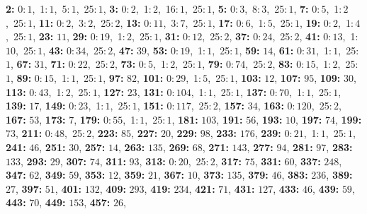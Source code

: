 \textsf{\bfseries 2:} 0:\,$1$,\ 1:\,$1$,\ 5:\,$1$,\ 25:\,$1$, \textsf{\bfseries 3:} 0:\,$2$,\ 1:\,$2$,\ 16:\,$1$,\ 25:\,$1$, \textsf{\bfseries 5:} 0:\,$3$,\ 8:\,$3$,\ 25:\,$1$, \textsf{\bfseries 7:} 0:\,$5$,\ 1:\,$2$,\ 25:\,$1$, \textsf{\bfseries 11:} 0:\,$2$,\ 3:\,$2$,\ 25:\,$2$, \textsf{\bfseries 13:} 0:\,$11$,\ 3:\,$7$,\ 25:\,$1$, \textsf{\bfseries 17:} 0:\,$6$,\ 1:\,$5$,\ 25:\,$1$, \textsf{\bfseries 19:} 0:\,$2$,\ 1:\,$4$,\ 25:\,$1$, \textsf{\bfseries 23:} $11$, \textsf{\bfseries 29:} 0:\,$19$,\ 1:\,$2$,\ 25:\,$1$, \textsf{\bfseries 31:} 0:\,$12$,\ 25:\,$2$, \textsf{\bfseries 37:} 0:\,$24$,\ 25:\,$2$, \textsf{\bfseries 41:} 0:\,$13$,\ 1:\,$10$,\ 25:\,$1$, \textsf{\bfseries 43:} 0:\,$34$,\ 25:\,$2$, \textsf{\bfseries 47:} $39$, \textsf{\bfseries 53:} 0:\,$19$,\ 1:\,$1$,\ 25:\,$1$, \textsf{\bfseries 59:} $14$, \textsf{\bfseries 61:} 0:\,$31$,\ 1:\,$1$,\ 25:\,$1$, \textsf{\bfseries 67:} $31$, \textsf{\bfseries 71:} 0:\,$22$,\ 25:\,$2$, \textsf{\bfseries 73:} 0:\,$5$,\ 1:\,$2$,\ 25:\,$1$, \textsf{\bfseries 79:} 0:\,$74$,\ 25:\,$2$, \textsf{\bfseries 83:} 0:\,$15$,\ 1:\,$2$,\ 25:\,$1$, \textsf{\bfseries 89:} 0:\,$15$,\ 1:\,$1$,\ 25:\,$1$, \textsf{\bfseries 97:} $82$, \textsf{\bfseries 101:} 0:\,$29$,\ 1:\,$5$,\ 25:\,$1$, \textsf{\bfseries 103:} $12$, \textsf{\bfseries 107:} $95$, \textsf{\bfseries 109:} $30$, \textsf{\bfseries 113:} 0:\,$43$,\ 1:\,$2$,\ 25:\,$1$, \textsf{\bfseries 127:} $23$, \textsf{\bfseries 131:} 0:\,$104$,\ 1:\,$1$,\ 25:\,$1$, \textsf{\bfseries 137:} 0:\,$70$,\ 1:\,$1$,\ 25:\,$1$, \textsf{\bfseries 139:} $17$, \textsf{\bfseries 149:} 0:\,$23$,\ 1:\,$1$,\ 25:\,$1$, \textsf{\bfseries 151:} 0:\,$117$,\ 25:\,$2$, \textsf{\bfseries 157:} $34$, \textsf{\bfseries 163:} 0:\,$120$,\ 25:\,$2$, \textsf{\bfseries 167:} $53$, \textsf{\bfseries 173:} $7$, \textsf{\bfseries 179:} 0:\,$55$,\ 1:\,$1$,\ 25:\,$1$, \textsf{\bfseries 181:} $103$, \textsf{\bfseries 191:} $56$, \textsf{\bfseries 193:} $10$, \textsf{\bfseries 197:} $74$, \textsf{\bfseries 199:} $73$, \textsf{\bfseries 211:} 0:\,$48$,\ 25:\,$2$, \textsf{\bfseries 223:} $85$, \textsf{\bfseries 227:} $20$, \textsf{\bfseries 229:} $98$, \textsf{\bfseries 233:} $176$, \textsf{\bfseries 239:} 0:\,$21$,\ 1:\,$1$,\ 25:\,$1$, \textsf{\bfseries 241:} $46$, \textsf{\bfseries 251:} $30$, \textsf{\bfseries 257:} $14$, \textsf{\bfseries 263:} $135$, \textsf{\bfseries 269:} $68$, \textsf{\bfseries 271:} $143$, \textsf{\bfseries 277:} $94$, \textsf{\bfseries 281:} $97$, \textsf{\bfseries 283:} $133$, \textsf{\bfseries 293:} $29$, \textsf{\bfseries 307:} $74$, \textsf{\bfseries 311:} $93$, \textsf{\bfseries 313:} 0:\,$20$,\ 25:\,$2$, \textsf{\bfseries 317:} $75$, \textsf{\bfseries 331:} $60$, \textsf{\bfseries 337:} $248$, \textsf{\bfseries 347:} $62$, \textsf{\bfseries 349:} $59$, \textsf{\bfseries 353:} $12$, \textsf{\bfseries 359:} $21$, \textsf{\bfseries 367:} $10$, \textsf{\bfseries 373:} $135$, \textsf{\bfseries 379:} $46$, \textsf{\bfseries 383:} $236$, \textsf{\bfseries 389:} $27$, \textsf{\bfseries 397:} $51$, \textsf{\bfseries 401:} $132$, \textsf{\bfseries 409:} $293$, \textsf{\bfseries 419:} $234$, \textsf{\bfseries 421:} $71$, \textsf{\bfseries 431:} $127$, \textsf{\bfseries 433:} $46$, \textsf{\bfseries 439:} $59$, \textsf{\bfseries 443:} $70$, \textsf{\bfseries 449:} $153$, \textsf{\bfseries 457:} $26$, 